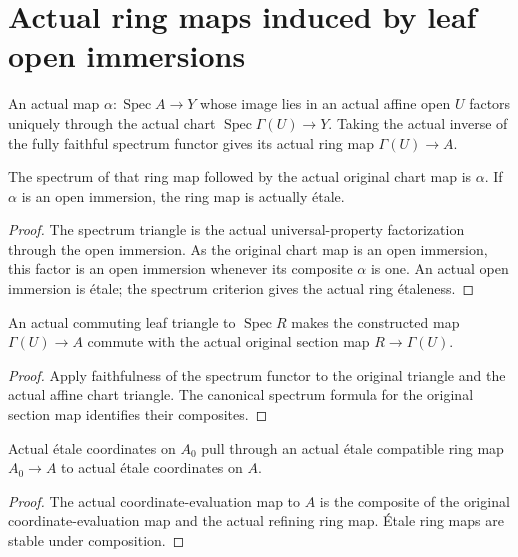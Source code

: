 \section{Actual ring maps induced by leaf open immersions}

\begin{definition}\label{def:sc0-affine-open-chart-ring-map}
\leanok
An actual map $\alpha:\operatorname{Spec}A\to Y$ whose image lies in an
actual affine open $U$ factors uniquely through the actual chart
$\operatorname{Spec}\Gamma(U)\to Y$. Taking the actual inverse of the fully
faithful spectrum functor gives its actual ring map $\Gamma(U)\to A$.
\end{definition}

\begin{lemma}\label{lem:sc0-affine-open-chart-ring-map-etale}
\leanok
{}
The spectrum of that ring map followed by the actual original chart map is
$\alpha$. If $\alpha$ is an open immersion, the ring map is actually \'etale.
\end{lemma}
\begin{proof}
The spectrum triangle is the actual universal-property factorization through
the open immersion. As the original chart map is an open immersion, this
factor is an open immersion whenever its composite $\alpha$ is one. An actual
open immersion is \'etale; the spectrum criterion gives the actual ring
\'etaleness.
\end{proof}

\begin{lemma}\label{lem:sc0-affine-open-chart-base-compatibility}
\leanok
{}
An actual commuting leaf triangle to $\operatorname{Spec}R$ makes the
constructed map $\Gamma(U)\to A$ commute with the actual original section
map $R\to\Gamma(U)$.
\end{lemma}
\begin{proof}
Apply faithfulness of the spectrum functor to the original triangle and the
actual affine chart triangle. The canonical spectrum formula for the
original section map identifies their composites.
\end{proof}

\begin{lemma}\label{lem:sc0-etale-image-coordinates}
\leanok
Actual \'etale coordinates on $A_0$ pull through an actual \'etale compatible
ring map $A_0\to A$ to actual \'etale coordinates on $A$.
\end{lemma}
\begin{proof}
The actual coordinate-evaluation map to $A$ is the composite of the original
coordinate-evaluation map and the actual refining ring map. \'Etale ring maps
are stable under composition.
\end{proof}

